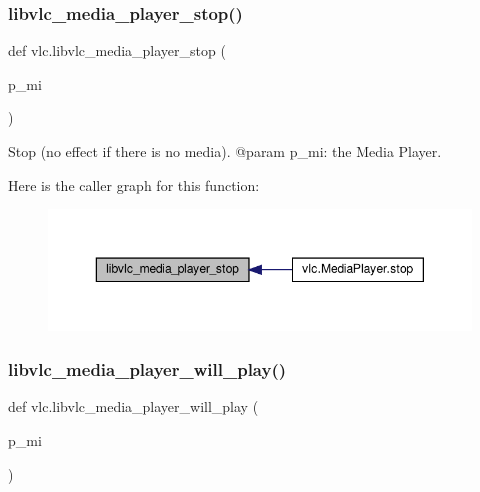\subsubsection{\texorpdfstring{libvlc\+\_\+media\+\_\+player\+\_\+stop()}{libvlc\_media\_player\_stop()}}
{\footnotesize\ttfamily def vlc.\+libvlc\+\_\+media\+\_\+player\+\_\+stop (\begin{DoxyParamCaption}\item[{}]{p\+\_\+mi }\end{DoxyParamCaption})}

\begin{DoxyVerb}Stop (no effect if there is no media).
@param p_mi: the Media Player.
\end{DoxyVerb}
 Here is the caller graph for this function\+:
\nopagebreak
\begin{figure}[H]
\begin{center}
\leavevmode
\includegraphics[width=350pt]{namespacevlc_a66bcd32fe71f703084d52d175874f6e1_icgraph}
\end{center}
\end{figure}
\mbox{\label{namespacevlc_af96b4d82a14cecf87ad162cd688dd86e}} 
\subsubsection{\texorpdfstring{libvlc\+\_\+media\+\_\+player\+\_\+will\+\_\+play()}{libvlc\_media\_player\_will\_play()}}
{\footnotesize\ttfamily def vlc.\+libvlc\+\_\+media\+\_\+player\+\_\+will\+\_\+play (\begin{DoxyParamCaption}\item[{}]{p\+\_\+mi }\end{DoxyParamCaption})}

